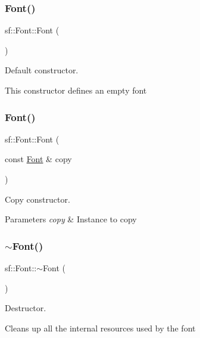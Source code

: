 \subsubsection{\texorpdfstring{Font()}{Font()}\hspace{0.1cm}{\footnotesize\ttfamily [1/2]}}
{\footnotesize\ttfamily sf\+::\+Font\+::\+Font (\begin{DoxyParamCaption}{ }\end{DoxyParamCaption})}



Default constructor. 

This constructor defines an empty font \mbox{\label{classsf_1_1_font_a72d7322b355ee2f1be4500f530e98081}} 
\subsubsection{\texorpdfstring{Font()}{Font()}\hspace{0.1cm}{\footnotesize\ttfamily [2/2]}}
{\footnotesize\ttfamily sf\+::\+Font\+::\+Font (\begin{DoxyParamCaption}\item[{const \hyperlink{classsf_1_1_font}{Font} \&}]{copy }\end{DoxyParamCaption})}



Copy constructor. 


\begin{DoxyParams}{Parameters}
{\em copy} & Instance to copy \\
\hline
\end{DoxyParams}
\mbox{\label{classsf_1_1_font_aa18a3c62e6e01e9a21c531b5cad4b7f2}} 
\subsubsection{\texorpdfstring{$\sim$\+Font()}{~Font()}}
{\footnotesize\ttfamily sf\+::\+Font\+::$\sim$\+Font (\begin{DoxyParamCaption}{ }\end{DoxyParamCaption})}



Destructor. 

Cleans up all the internal resources used by the font 

